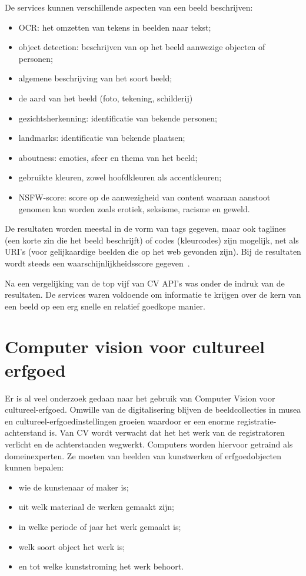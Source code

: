 De services kunnen verschillende aspecten van een beeld beschrijven:
\begin{itemize}
	\item OCR: het omzetten van tekens in beelden naar tekst;
	\item object detection: beschrijven van op het beeld aanwezige objecten of personen;
	\item algemene beschrijving van het soort beeld;
	\item de aard van het beeld (foto, tekening, schilderij)
	\item gezichtsherkenning: identificatie van bekende personen;
	\item landmarks: identificatie van bekende plaatsen;
	\item aboutness: emoties, sfeer en thema van het beeld;
	\item gebruikte kleuren, zowel hoofdkleuren als accentkleuren;
	\item NSFW-score: score op de aanwezigheid van content waaraan aanstoot genomen kan worden zoals erotiek, seksisme, racisme en geweld.
\end{itemize}

De resultaten worden meestal in de vorm van tags gegeven, maar ook taglines (een korte zin die het beeld beschrijft) of codes (kleurcodes) zijn mogelijk, net als URI’s (voor gelijkaardige beelden die op het web gevonden zijn). Bij de resultaten wordt steeds een waarschijnlijkheidsscore gegeven~\autocite{Vanstappen2019}.

Na een vergelijking van de top vijf van CV API’s was \textcite{Oberoi2016} onder de indruk van de resultaten. De services waren voldoende om informatie te krijgen over de kern van een beeld op een erg snelle en relatief goedkope manier.

\section{Computer vision voor cultureel erfgoed}
\label{sec:cv-voor-ce}

Er is al veel onderzoek gedaan naar het gebruik van Computer Vision voor cultureel-erfgoed. Omwille van de digitalisering blijven de beeldcollecties in musea en cultureel-erfgoedinstellingen groeien waardoor er een enorme registratie-achterstand is. Van CV wordt verwacht dat het het werk van de registratoren verlicht en de achterstanden wegwerkt. Computers worden hiervoor getraind als domeinexperten. Ze moeten van beelden van kunstwerken of erfgoedobjecten kunnen bepalen:
\begin{itemize}
	\item wie de kunstenaar of maker is;
	\item uit welk materiaal de werken gemaakt zijn; 
	\item in welke periode of jaar het werk gemaakt is;
	\item welk soort object het werk is;
	\item en tot welke kunststroming het werk behoort.  
\end{itemize}

